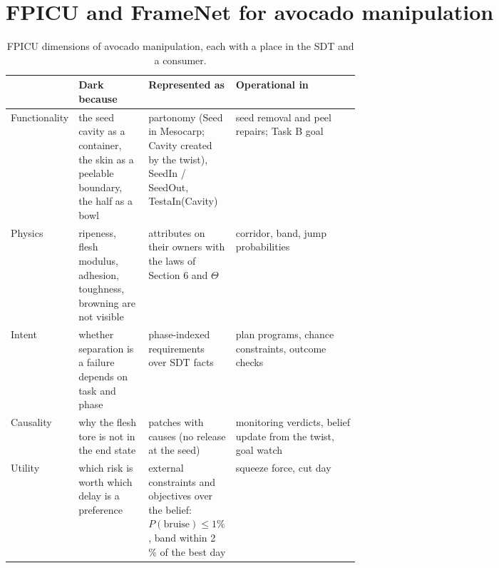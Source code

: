 \documentclass[10.5pt,a4paper]{article}
\begin{document}
\section{FPICU and FrameNet for avocado manipulation}
\begin{table}[htbp]\centering\scriptsize\caption{FPICU dimensions of avocado manipulation, each with a place in the SDT and a consumer.}
\begin{tabularx}{\linewidth}{@{}p{0.12\linewidth}p{0.2\linewidth}p{0.25\linewidth}X@{}}\toprule  & Dark because & Represented as & Operational in \\\midrule
Functionality & the seed cavity as a container, the skin as a peelable boundary, the half as a bowl & partonomy (Seed in Mesocarp; Cavity created by the twist), SeedIn / SeedOut, TestaIn(Cavity) & seed removal and peel repairs; Task B goal \\
Physics & ripeness, flesh modulus, adhesion, toughness, browning are not visible & attributes on their owners with the laws of Section 6 and $\Theta$ & corridor, band, jump probabilities \\
Intent & whether separation is a failure depends on task and phase & phase-indexed requirements over SDT facts & plan programs, chance constraints, outcome checks \\
Causality & why the flesh tore is not in the end state & patches with causes (no release at the seed) & monitoring verdicts, belief update from the twist, goal watch \\
Utility & which risk is worth which delay is a preference & external constraints and objectives over the belief: $P(\text{bruise})\le 1\%$, band within 2 \% of the best day & squeeze force, cut day \\\bottomrule\end{tabularx}\end{table}
\end{document}
